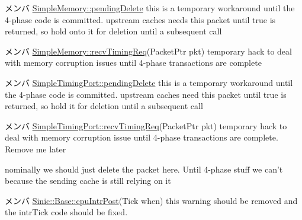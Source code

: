 \begin{DoxyDescription}
\item[メンバ \hyperlink{classSimpleMemory_a21da4bea3554874b557428e4cce5d4a4}{SimpleMemory::pendingDelete} ]this is a temporary workaround until the 4-\/phase code is committed. upstream caches needs this packet until true is returned, so hold onto it for deletion until a subsequent call 
\end{DoxyDescription}

\label{todo__todo000086}
\hypertarget{todo__todo000086}{}
 
\begin{DoxyDescription}
\item[メンバ \hyperlink{classSimpleMemory_a3344d9dd0f83257feab5424e761f31c6}{SimpleMemory::recvTimingReq}(PacketPtr pkt) ]temporary hack to deal with memory corruption issues until 4-\/phase transactions are complete 
\end{DoxyDescription}

\label{todo__todo000090}
\hypertarget{todo__todo000090}{}
 
\begin{DoxyDescription}
\item[メンバ \hyperlink{classSimpleTimingPort_a21da4bea3554874b557428e4cce5d4a4}{SimpleTimingPort::pendingDelete} ]this is a temporary workaround until the 4-\/phase code is committed. upstream caches need this packet until true is returned, so hold it for deletion until a subsequent call 
\end{DoxyDescription}

\label{todo__todo000088}
\hypertarget{todo__todo000088}{}
 
\begin{DoxyDescription}
\item[メンバ \hyperlink{classSimpleTimingPort_a3344d9dd0f83257feab5424e761f31c6}{SimpleTimingPort::recvTimingReq}(PacketPtr pkt) ]temporary hack to deal with memory corruption issue until 4-\/phase transactions are complete. Remove me later 

nominally we should just delete the packet here. Until 4-\/phase stuff we can't because the sending cache is still relying on it 
\end{DoxyDescription}

\label{todo__todo000070}
\hypertarget{todo__todo000070}{}
 
\begin{DoxyDescription}
\item[メンバ \hyperlink{classSinic_1_1Base_af1fc872917f4ac5efa0d55c5c139bc9a}{Sinic::Base::cpuIntrPost}(Tick when) ]this warning should be removed and the intrTick code should be fixed. 
\end{DoxyDescription}

